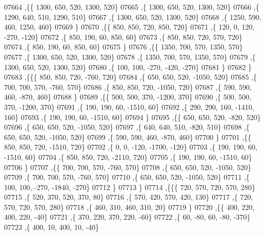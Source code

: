 \begin{DoxyCode}
07664    ,\{\{  1300,   650,   520,  1300,   520\}
07665     ,\{  1300,   650,   520,  1300,   520\}
07666     ,\{  1290,   640,   510,  1290,   510\}
07667     ,\{  1300,   650,   520,  1300,   520\}
07668     ,\{  1250,   590,   460,  1250,   460\}
07669     \}
07670    ,\{\{   850,   850,   720,   850,   720\}
07671     ,\{   120,     0,   120,  -270,  -120\}
07672     ,\{   850,   190,    60,   850,    60\}
07673     ,\{   850,   850,   720,   570,   720\}
07674     ,\{   850,   190,    60,   850,    60\}
07675     \}
07676    ,\{\{  1350,   700,   570,  1350,   570\}
07677     ,\{  1300,   650,   520,  1300,   520\}
07678     ,\{  1350,   700,   570,  1350,   570\}
07679     ,\{  1300,   650,   520,  1300,   520\}
07680     ,\{   100,   100,  -270,  -420,  -270\}
07681     \}
07682    \}
07683   ,\{\{\{   850,   850,   720,  -760,   720\}
07684     ,\{   650,   650,   520, -1050,   520\}
07685     ,\{   700,   700,   570,  -760,   570\}
07686     ,\{   850,   850,   720, -1050,   720\}
07687     ,\{   590,   590,   460,  -870,   460\}
07688     \}
07689    ,\{\{   500,   500,   370, -1200,   370\}
07690     ,\{   500,   500,   370, -1200,   370\}
07691     ,\{   190,   190,    60, -1510,    60\}
07692     ,\{   290,   290,   160, -1410,   160\}
07693     ,\{   190,   190,    60, -1510,    60\}
07694     \}
07695    ,\{\{   650,   650,   520,  -820,   520\}
07696     ,\{   650,   650,   520, -1050,   520\}
07697     ,\{   640,   640,   510,  -820,   510\}
07698     ,\{   650,   650,   520, -1050,   520\}
07699     ,\{   590,   590,   460,  -870,   460\}
07700     \}
07701    ,\{\{   850,   850,   720, -1510,   720\}
07702     ,\{     0,     0,  -120, -1700,  -120\}
07703     ,\{   190,   190,    60, -1510,    60\}
07704     ,\{   850,   850,   720, -2110,   720\}
07705     ,\{   190,   190,    60, -1510,    60\}
07706     \}
07707    ,\{\{   700,   700,   570,  -760,   570\}
07708     ,\{   650,   650,   520, -1050,   520\}
07709     ,\{   700,   700,   570,  -760,   570\}
07710     ,\{   650,   650,   520, -1050,   520\}
07711     ,\{   100,   100,  -270, -1840,  -270\}
07712     \}
07713    \}
07714   ,\{\{\{   720,   570,   720,   570,   280\}
07715     ,\{   520,   370,   520,   370,    80\}
07716     ,\{   570,   420,   570,   420,   130\}
07717     ,\{   720,   570,   720,   570,   280\}
07718     ,\{   460,   310,   460,   310,    20\}
07719     \}
07720    ,\{\{   400,   220,   400,   220,   -40\}
07721     ,\{   370,   220,   370,   220,   -60\}
07722     ,\{    60,   -80,    60,   -80,  -370\}
07723     ,\{   400,    10,   400,    10,   -40\}

\end{DoxyCode}
